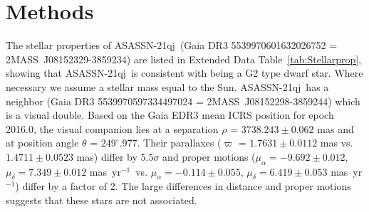 \documentclass[sn-nature]{sn-jnl}%
\newcommand{\asas}{ASASSN-21qj}
\newcommand{\masyr}{mas~yr$^{-1}$}
\begin{document}









\setcounter{figure}{0}    

\renewcommand\figurename{Extended Data Fig.}%
\renewcommand\tablename{Extended Data Table}%


\section{Methods}\label{sec:methods}

The stellar properties of \asas\ (Gaia DR3 5539970601632026752 = 2MASS~J08152329-3859234) are listed in Extended Data Table~\ref{tab:Stellarprop}, showing that \asas\ is consistent with being a G2 type dwarf star.
%
Where necessary we assume a stellar mass equal to the Sun.
%
\asas\  has a neighbor (Gaia DR3 5539970597334497024 = 2MASS~J08152298-3859244) which is a visual double.
%
Based on the Gaia EDR3 mean ICRS position for epoch 2016.0, the visual companion lies at a separation $\rho$ = $3738.243\pm0.062$ mas and at position angle $\theta$ = $249^{\circ}.977$.
%
Their parallaxes ($\varpi$ = $1.7631\pm0.0112$ mas vs. $1.4711\pm0.0523$ mas) differ by 5.5$\sigma$ and proper motions ($\mu_{\alpha} = -9.692\pm0.012$, $\mu_{\delta} = 7.349\pm0.012$ \masyr\, vs. $\mu_{\alpha} = -0.114\pm0.055$, $\mu_{\delta} = 6.419\pm0.053$ \masyr) differ by a factor of 2.
%
The large differences in distance and proper motions suggests that these stars are not associated.
\end{document}
